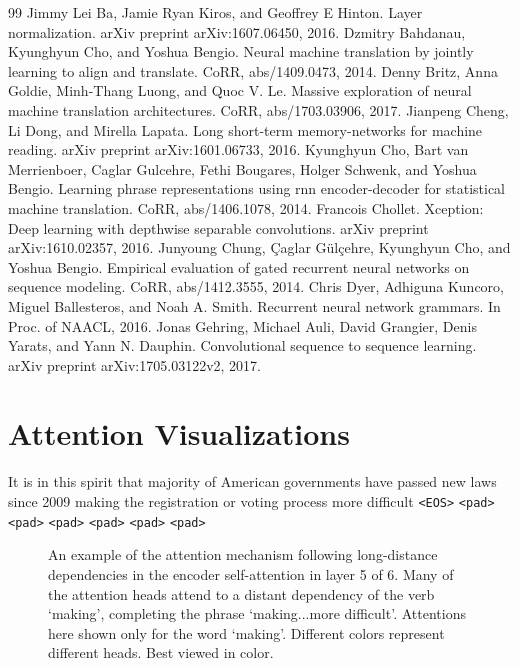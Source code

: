 \documentclass[12pt, a4paper]{article}
\begin{document}
\begin{thebibliography}{99}
 Jimmy Lei Ba, Jamie Ryan Kiros, and Geoffrey E Hinton. Layer normalization. arXiv preprint arXiv:1607.06450, 2016.
 Dzmitry Bahdanau, Kyunghyun Cho, and Yoshua Bengio. Neural machine translation by jointly learning to align and translate. CoRR, abs/1409.0473, 2014.
 Denny Britz, Anna Goldie, Minh-Thang Luong, and Quoc V. Le. Massive exploration of neural machine translation architectures. CoRR, abs/1703.03906, 2017.
 Jianpeng Cheng, Li Dong, and Mirella Lapata. Long short-term memory-networks for machine reading. arXiv preprint arXiv:1601.06733, 2016.
 Kyunghyun Cho, Bart van Merrienboer, Caglar Gulcehre, Fethi Bougares, Holger Schwenk, and Yoshua Bengio. Learning phrase representations using rnn encoder-decoder for statistical machine translation. CoRR, abs/1406.1078, 2014.
 Francois Chollet. Xception: Deep learning with depthwise separable convolutions. arXiv preprint arXiv:1610.02357, 2016.
 Junyoung Chung, Çaglar Gülçehre, Kyunghyun Cho, and Yoshua Bengio. Empirical evaluation of gated recurrent neural networks on sequence modeling. CoRR, abs/1412.3555, 2014.
 Chris Dyer, Adhiguna Kuncoro, Miguel Ballesteros, and Noah A. Smith. Recurrent neural network grammars. In Proc. of NAACL, 2016.
 Jonas Gehring, Michael Auli, David Grangier, Denis Yarats, and Yann N. Dauphin. Convolutional sequence to sequence learning. arXiv preprint arXiv:1705.03122v2, 2017.
 \cite{ref12} 
 \cite{ref18} 
 \cite{ref20} 
 \cite{ref25} 
 \cite{ref29} 
 \cite{ref31} 
 \cite{ref32} 
 \cite{ref33} 
 \cite{ref36} 
 \cite{ref37} 
 \cite{ref38} 
 \cite{ref39} 
 \cite{ref40} 
\end{thebibliography}

\section{Attention Visualizations}

It is in this spirit that majority of American governments have passed new laws since 2009 making the registration or voting process more difficult \texttt{<EOS>} \texttt{<pad>} \texttt{<pad>} \texttt{<pad>} \texttt{<pad>} \texttt{<pad>} \texttt{<pad>}

\begin{figure}[ht]
\centering
\caption{An example of the attention mechanism following long-distance dependencies in the encoder self-attention in layer 5 of 6. Many of the attention heads attend to a distant dependency of the verb `making', completing the phrase `making...more difficult'. Attentions here shown only for the word `making'. Different colors represent different heads. Best viewed in color.}
\label{fig:attention1}
\end{figure}
\end{document}
